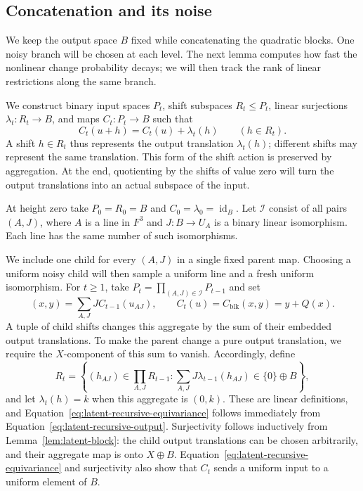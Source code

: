 \subsection{Concatenation and its noise}

We keep the output space $B$ fixed while concatenating the quadratic blocks.
One noisy branch will be chosen at each level.  The next lemma computes how
fast the nonlinear change probability decays; we will then track the rank
of linear restrictions along the same branch.

We construct binary input spaces $P_t$, shift subspaces $R_t\le P_t$,
linear surjections $\lambda_t:R_t\to B$, and maps $C_t:P_t\to B$ such that
\begin{equation}\label{eq:latent-recursive-equivariance}
 C_t(u+h)=C_t(u)+\lambda_t(h)
 \qquad(h\in R_t).
\end{equation}
A shift $h\in R_t$ thus represents the output translation $\lambda_t(h)$;
different shifts may represent the same translation.  This form of the
shift action is preserved by aggregation.  At the end, quotienting by the
shifts of value zero will turn the output translations into an actual
subspace of the input.

At height zero take $P_0=R_0=B$ and $C_0=\lambda_0=\operatorname{id}_B$.
Let $\mathcal I$ consist of all pairs $(A,J)$, where $A$ is a line in
$F^3$ and $J:B\to U_A$ is a binary linear isomorphism.  Each line has
the same number of such isomorphisms.

We include one child for every $(A,J)$ in a single fixed parent map.
Choosing a uniform noisy child will then sample a uniform line and a fresh
uniform isomorphism.
For $t\ge1$, take $P_t=\prod_{(A,J)\in\mathcal I}P_{t-1}$ and set
\begin{equation}\label{eq:latent-recursive-output}
 (x,y)=\sum_{A,J}J C_{t-1}(u_{AJ}),
 \qquad C_t(u)=C_{\mathrm{blk}}(x,y)=y+Q(x).
\end{equation}
A tuple of child shifts changes this aggregate by the sum of their embedded
output translations.  To make the parent change a pure output translation,
we require the $X$-component of this sum to vanish.  Accordingly, define
\begin{equation}\label{eq:latent-recursive-shifts}
 R_t=\left\{(h_{AJ})\in\prod_{A,J}R_{t-1}:
       \sum_{A,J}J\lambda_{t-1}(h_{AJ})\in\{0\}\oplus B\right\},
\end{equation}
and let $\lambda_t(h)=k$ when this aggregate is $(0,k)$.
These are linear definitions, and Equation~\eqref{eq:latent-recursive-equivariance}
follows immediately from Equation~\eqref{eq:latent-recursive-output}.
Surjectivity follows inductively from Lemma~\ref{lem:latent-block}: the
child output translations can be chosen arbitrarily, and their aggregate map
is onto $X\oplus B$.
Equation~\eqref{eq:latent-recursive-equivariance} and surjectivity also show
that $C_t$ sends a uniform input to a uniform element of $B$.

